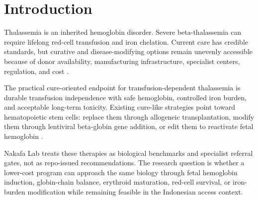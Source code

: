 \section{Introduction}

Thalassemia is an inherited hemoglobin disorder. Severe beta-thalassemia can
require lifelong red-cell transfusion and iron chelation. Current care has
credible standards, but curative and disease-modifying options remain unevenly
accessible because of donor availability, manufacturing infrastructure,
specialist centers, regulation, and cost \cite{farmakis2022tif}.

The practical cure-oriented endpoint for transfusion-dependent thalassemia is
durable transfusion independence with safe hemoglobin, controlled iron burden,
and acceptable long-term toxicity. Existing cure-like strategies point toward
hematopoietic stem cells: replace them through allogeneic transplantation,
modify them through lentiviral beta-globin gene addition, or edit them to
reactivate fetal hemoglobin \cite{locatelli2024exaCel,thompson2022beticel}.

Nakafa Lab treats these therapies as biological benchmarks and specialist
referral gates, not as repo-issued recommendations. The research question is
whether a lower-cost program can approach the same biology through fetal
hemoglobin induction, globin-chain balance, erythroid maturation, red-cell
survival, or iron-burden modification while remaining feasible in the Indonesian
access context.


